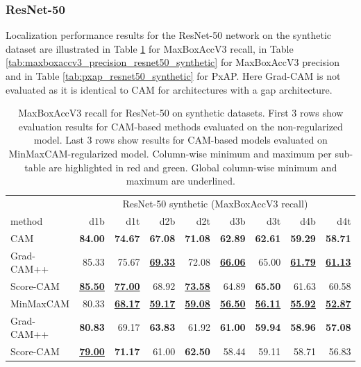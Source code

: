 \subsubsection{ResNet-50}
Localization performance results for the ResNet-50 network on the synthetic dataset are illustrated in Table \ref{tab:maxboxaccv3_recall_resnet50_synthetic} for MaxBoxAccV3 recall, in Table \ref{tab:maxboxaccv3_precision_resnet50_synthetic} for MaxBoxAccV3 precision and in Table \ref{tab:pxap_resnet50_synthetic} for PxAP. Here Grad-CAM is not evaluated as it is identical to CAM for architectures with a \acrshort{gap} architecture.

\begin{table}[h]
\centering
\begin{tabular}{lrrrrrrrr}
\toprule
 & \multicolumn{8}{c}{ResNet-50 synthetic (MaxBoxAccV3 recall)} \\
method & d1b & d1t & d2b & d2t & d3b & d3t & d4b & d4t \\
\cmidrule(lr){1-1} \cmidrule(lr){2-9}
CAM & \color{purple} \bfseries 84.00 & \color{purple} \bfseries 74.67 & \color{purple} \bfseries 67.08 & \color{purple} \bfseries 71.08 & \color{purple} \bfseries 62.89 & \color{purple} \bfseries 62.61 & \color{purple} \bfseries 59.29 & \color{purple} \bfseries 58.71 \\
Grad-CAM++ & 85.33 & 75.67 & \color{teal} \bfseries \underline{69.33} & 72.08 & \color{teal} \bfseries \underline{66.06} & 65.00 & \color{teal} \bfseries \underline{61.79} & \color{teal} \bfseries \underline{61.13} \\
Score-CAM & \color{teal} \bfseries \underline{85.50} & \color{teal} \bfseries \underline{77.00} & 68.92 & \color{teal} \bfseries \underline{73.58} & 64.89 & \color{teal} \bfseries 65.50 & 61.63 & 60.58 \\
\cmidrule(lr){1-1} \cmidrule(lr){2-9}
MinMaxCAM & 80.33 & \color{purple} \bfseries \underline{68.17} & \color{purple} \bfseries \underline{59.17} & \color{purple} \bfseries \underline{59.08} & \color{purple} \bfseries \underline{56.50} & \color{purple} \bfseries \underline{56.11} & \color{purple} \bfseries \underline{55.92} & \color{purple} \bfseries \underline{52.87} \\
Grad-CAM++ & \color{teal} \bfseries 80.83 & 69.17 & \color{teal} \bfseries 63.83 & 61.92 & \color{teal} \bfseries 61.00 & \color{teal} \bfseries 59.94 & \color{teal} \bfseries 58.96 & \color{teal} \bfseries 57.08 \\
Score-CAM & \color{purple} \bfseries \underline{79.00} & \color{teal} \bfseries 71.17 & 61.00 & \color{teal} \bfseries 62.50 & 58.44 & 59.11 & 58.71 & 56.83 \\
\bottomrule
\end{tabular}
\caption[MaxBoxAccV3 recall for ResNet-50 on synthetic datasets]{MaxBoxAccV3 recall for ResNet-50 on synthetic datasets. First 3 rows show evaluation results for CAM-based methods evaluated on the non-regularized model. Last 3 rows show results for CAM-based models evaluated on MinMaxCAM-regularized model.  Column-wise minimum and maximum per sub-table are highlighted in red and green. Global column-wise minimum and maximum are underlined.}
\label{tab:maxboxaccv3_recall_resnet50_synthetic}
\end{table}

